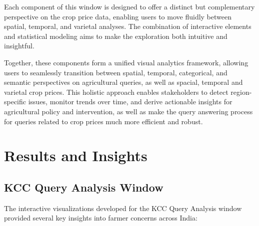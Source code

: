 \documentclass[a4paper, 12pt]{article}
\begin{document}
Each component of this window is designed to offer a distinct but complementary perspective on the crop price data, enabling users to move fluidly between spatial, temporal, and varietal analyses. The combination of interactive elements and statistical modeling aims to make the exploration both intuitive and insightful.




\vspace{0.5em}


Together, these components form a unified visual analytics framework, allowing users to seamlessly transition between spatial, temporal, categorical, and semantic perspectives on agricultural queries, as well as spacial, temporal and varietal crop prices. This holistic approach enables stakeholders to detect region-specific issues, monitor trends over time, and derive actionable insights for agricultural policy and intervention, as well as make the query answering process for queries related to crop prices much more efficient and robust.


\noindent\section{Results and Insights}


\subsection{KCC Query Analysis Window}

The interactive visualizations developed for the KCC Query Analysis window provided several key insights into farmer concerns across India:
\end{document}
